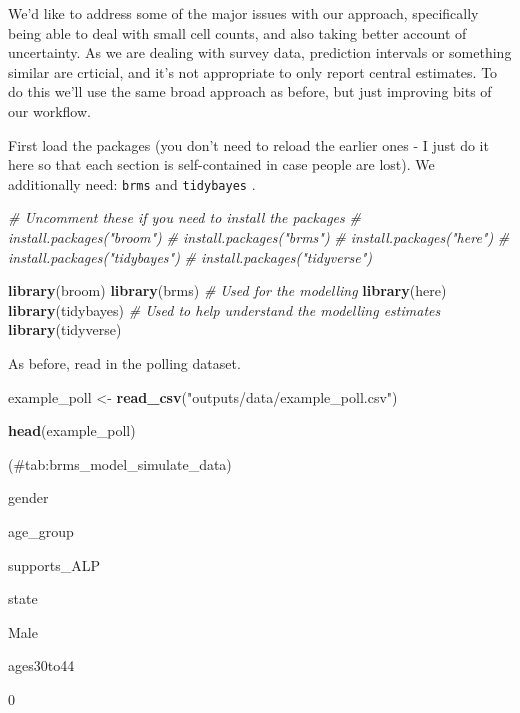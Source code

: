 \documentclass[
]{book}
\newenvironment{Shaded}{\begin{snugshade}}{\end{snugshade}}
\newcommand{\CommentTok}[1]{\textcolor[rgb]{0.56,0.35,0.01}{\textit{#1}}}
\newcommand{\KeywordTok}[1]{\textcolor[rgb]{0.13,0.29,0.53}{\textbf{#1}}}
\newcommand{\NormalTok}[1]{#1}
\newcommand{\StringTok}[1]{\textcolor[rgb]{0.31,0.60,0.02}{#1}}
\begin{document}
We'd like to address some of the major issues with our approach, specifically being able to deal with small cell counts, and also taking better account of uncertainty. As we are dealing with survey data, prediction intervals or something similar are crticial, and it's not appropriate to only report central estimates. To do this we'll use the same broad approach as before, but just improving bits of our workflow.

First load the packages (you don't need to reload the earlier ones - I just do it here so that each section is self-contained in case people are lost). We additionally need: \texttt{brms} \citep{citebrms} and \texttt{tidybayes} \citep{citetidybayes}.

\begin{Shaded}
\begin{Highlighting}[]
\CommentTok{# Uncomment these if you need to install the packages}
\CommentTok{# install.packages("broom")}
\CommentTok{# install.packages("brms")}
\CommentTok{# install.packages("here") }
\CommentTok{# install.packages("tidybayes")}
\CommentTok{# install.packages("tidyverse") }

\KeywordTok{library}\NormalTok{(broom)}
\KeywordTok{library}\NormalTok{(brms) }\CommentTok{# Used for the modelling}
\KeywordTok{library}\NormalTok{(here)}
\KeywordTok{library}\NormalTok{(tidybayes) }\CommentTok{# Used to help understand the modelling estimates}
\KeywordTok{library}\NormalTok{(tidyverse) }
\end{Highlighting}
\end{Shaded}

As before, read in the polling dataset.

\begin{Shaded}
\begin{Highlighting}[]
\NormalTok{example_poll <-}\StringTok{ }\KeywordTok{read_csv}\NormalTok{(}\StringTok{"outputs/data/example_poll.csv"}\NormalTok{)}

\KeywordTok{head}\NormalTok{(example_poll)}
\end{Highlighting}
\end{Shaded}

(\#tab:brms\_model\_simulate\_data)

gender

age\_group

supports\_ALP

state

Male

ages30to44

0
\end{document}
